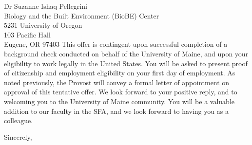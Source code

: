 \documentclass[a4paper,11pt]{letter}
\begin{document}
\begin{letter}{Dr Suzanne Ishaq Pellegrini\\Biology and the Built Environment (BioBE) Center\\5231 University of Oregon\\103 Pacific Hall\\Eugene, OR 97403}
This offer is contingent upon successful completion of a background check conducted on behalf of the University of Maine, and upon your eligibility to work legally in the United States. You will be asked to present proof of citizenship and employment eligibility on your first day of employment. As noted previously, the Provost will convey a formal letter of appointment on approval of this tentative offer. We look forward to your positive reply, and to welcoming you to the University of Maine community. You will be a valuable addition to our faculty in the SFA, and we look forward to having you as a colleague.
\closing{\hspace{-3em}Sincerely,} %
~\\~\\
\end{letter}
\end{document}

